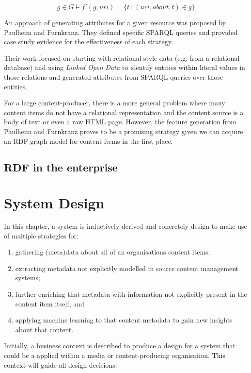 \documentclass[10pt,a4paper]{report}
\begin{document}
$$
g \in G \models f'(g, uri) = \{t \: | \: (uri, about, t) \in g\} 
$$

An approach of generating attributes for a given resource was proposed by
Paulheim and F\:urnkranz\cite{paulheim2012unsupervised}. They defined specific
SPARQL queries and provided case study evidence for the effectiveness of
each strategy.

Their work focused on starting with relational-style data (e.g. from a
relational database) and using \emph{Linked Open Data} to identify entities
within literal values in those relations and generated attributes from
SPARQL queries over those entities.

For a large content-producer, there is a more general problem where many content
items do not have a relational representation and the content source is a body
of text or even a raw HTML page. However, the feature generation from Paulheim
and F\:urnkranz proves to be a promising strategy given we can acquire an RDF
graph model for content items in the first place.

\section{RDF in the enterprise}
\label{sec:linked-enterprise-data}

\chapter{System Design}

In this chapter, a system is inductively derived and concretely design to make
use of multiple strategies for:

\begin{enumerate}
\item gathering (meta)data about all of an organisations content items;
\item extracting metadata not explicitly modelled in source content management
systems;
\item further enriching that metadata with information not explicitly present
in the content item itself; and
\item applying machine learning to that content metadata to gain new insights
about that content.
\end{enumerate}

Initially, a business context is described to produce a design for a system
that could be a applied within a media or content-producing organisation. This
context will guide all design decisions.
\end{document}
